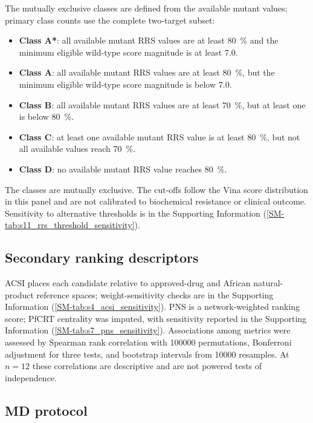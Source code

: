 \documentclass[11pt,a4paper]{article}
\begin{document}
The mutually exclusive classes are defined from the available mutant values; primary class counts use the complete two-target subset:
\begin{itemize}
    \item \textbf{Class A*}: all available mutant RRS values are at least \qty{80}{\percent} and the minimum eligible wild-type score magnitude is at least \qty{7.0}{\kcalmol}.
    \item \textbf{Class A}: all available mutant RRS values are at least \qty{80}{\percent}, but the minimum eligible wild-type score magnitude is below \qty{7.0}{\kcalmol}.
    \item \textbf{Class B}: all available mutant RRS values are at least \qty{70}{\percent}, but at least one is below \qty{80}{\percent}.
    \item \textbf{Class C}: at least one available mutant RRS value is at least \qty{80}{\percent}, but not all available values reach \qty{70}{\percent}.
    \item \textbf{Class D}: no available mutant RRS value reaches \qty{80}{\percent}.
\end{itemize}
The classes are mutually exclusive. The cut-offs follow the Vina score distribution in this panel and are not calibrated to biochemical resistance or clinical outcome. Sensitivity to alternative thresholds is in the Supporting Information (\cref{SM-tab:s11_rrs_threshold_sensitivity}).

\subsection{Secondary ranking descriptors}

ACSI places each candidate relative to approved-drug and African natural-product reference spaces; weight-sensitivity checks are in the Supporting Information (\cref{SM-tab:s4_acsi_sensitivity}). PNS is a network-weighted ranking score; PfCRT centrality was imputed, with sensitivity reported in the Supporting Information (\cref{SM-tab:s7_pns_sensitivity}). Associations among metrics were assessed by Spearman rank correlation with \num{100000} permutations, Bonferroni adjustment for three tests, and bootstrap intervals from \num{10000} resamples. At $n=\num{12}$ these correlations are descriptive and are not powered tests of independence.

\subsection{MD protocol}
\end{document}
